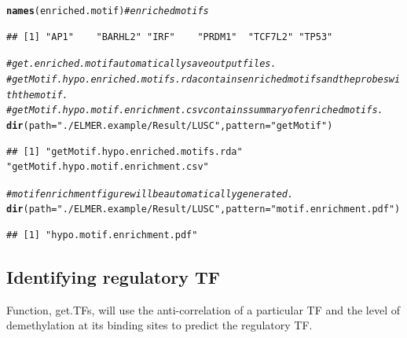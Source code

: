 \documentclass{article}\usepackage[]{graphicx}\usepackage[usenames,dvipsnames]{color}
\makeatletter
\newcommand{\hlstr}[1]{\textcolor[rgb]{0.192,0.494,0.8}{#1}}%
\newcommand{\hlcom}[1]{\textcolor[rgb]{0.678,0.584,0.686}{\textit{#1}}}%
\newcommand{\hlstd}[1]{\textcolor[rgb]{0.345,0.345,0.345}{#1}}%
\newcommand{\hlkwc}[1]{\textcolor[rgb]{0.333,0.667,0.333}{#1}}%
\newcommand{\hlkwd}[1]{\textcolor[rgb]{0.737,0.353,0.396}{\textbf{#1}}}%
\newenvironment{kframe}{%
 \def\at@end@of@kframe{}%
 \ifinner\ifhmode%
  \def\at@end@of@kframe{\end{minipage}}%
  \begin{minipage}{\columnwidth}%
 \fi\fi%
 \def\FrameCommand##1{\hskip\@totalleftmargin \hskip-\fboxsep
 \colorbox{shadecolor}{##1}\hskip-\fboxsep
     \hskip-\linewidth \hskip-\@totalleftmargin \hskip\columnwidth}%
 \MakeFramed {\advance\hsize-\width
   \@totalleftmargin\z@ \linewidth\hsize
   \@setminipage}}%
 {\par\unskip\endMakeFramed%
 \at@end@of@kframe}
\newenvironment{knitrout}{}{} %
\makeatother
\begin{document}
\begin{knitrout}
\begin{kframe}
{\ttfamily\noindent\itshape\color{messagecolor}{\#\# 6 motifs are enriched.}}\begin{alltt}
\hlkwd{names}\hlstd{(enriched.motif)}  \hlcom{# enriched motifs}
\end{alltt}
\begin{verbatim}
## [1] "AP1"    "BARHL2" "IRF"    "PRDM1"  "TCF7L2" "TP53"
\end{verbatim}
\begin{alltt}
\hlcom{# get.enriched.motif automatically save output files. }
\hlcom{# getMotif.hypo.enriched.motifs.rda contains enriched motifs and the probes with the motif. }
\hlcom{# getMotif.hypo.motif.enrichment.csv contains summary of enriched motifs.}
\hlkwd{dir}\hlstd{(}\hlkwc{path} \hlstd{=} \hlstr{"./ELMER.example/Result/LUSC"}\hlstd{,} \hlkwc{pattern} \hlstd{=} \hlstr{"getMotif"}\hlstd{)}
\end{alltt}
\begin{verbatim}
## [1] "getMotif.hypo.enriched.motifs.rda"  "getMotif.hypo.motif.enrichment.csv"
\end{verbatim}
\begin{alltt}
\hlcom{# motif enrichment figure will be automatically generated.}
\hlkwd{dir}\hlstd{(}\hlkwc{path} \hlstd{=} \hlstr{"./ELMER.example/Result/LUSC"}\hlstd{,} \hlkwc{pattern} \hlstd{=} \hlstr{"motif.enrichment.pdf"}\hlstd{)}
\end{alltt}
\begin{verbatim}
## [1] "hypo.motif.enrichment.pdf"
\end{verbatim}
\end{kframe}
\end{knitrout}


\subsection{Identifying regulatory TF}
Function, get.TFs, will use the anti-correlation of a particular TF and the level of 
demethylation at its binding sites to predict the regulatory TF.
\end{document}

